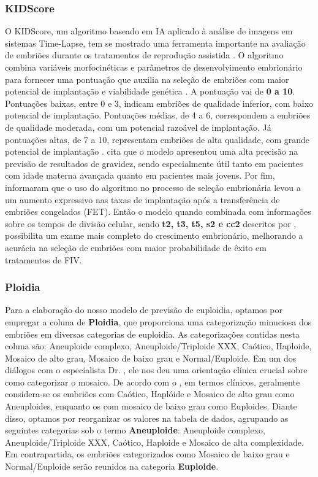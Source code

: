 \subsubsection{KIDScore\texttrademark}  
O KIDScore\texttrademark{}, um algoritmo baseado em IA aplicado à análise de imagens em sistemas Time-Lapse, tem se mostrado uma ferramenta importante na avaliação de embriões durante os tratamentos de reprodução assistida \cite{kato2021}. O algoritmo combina variáveis morfocinéticas e parâmetros de desenvolvimento embrionário para fornecer uma pontuação que auxilia na seleção de embriões com maior potencial de implantação e viabilidade genética \cite{gazzo2020}. A pontuação vai de \textbf{0 a 10}. Pontuações baixas, entre 0 e 3, indicam embriões de qualidade inferior, com baixo potencial de implantação. Pontuações médias, de 4 a 6, correspondem a embriões de qualidade moderada, com um potencial razoável de implantação. Já pontuações altas, de 7 a 10, representam embriões de alta qualidade, com grande potencial de implantação \cite{gazzo2020}.  cita que o modelo apresentou uma alta precisão na previsão de resultados de gravidez, sendo especialmente útil tanto em pacientes com idade materna avançada quanto em pacientes mais jovens. Por fim,  informaram que o uso do algoritmo no processo de seleção embrionária levou a um aumento expressivo nas taxas de implantação após a transferência de embriões congelados (FET). Então o modelo quando combinada com informações sobre os tempos de divisão celular, sendo \textbf{t2, t3, t5, s2 e cc2} descritos por , possibilita um exame mais completo do crescimento embrionário, melhorando a acurácia na seleção de embriões com maior probabilidade de êxito em tratamentos de FIV. 

\subsubsection{Ploidia}
Para a elaboração do nosso modelo de previsão de euploidia, optamos por empregar a coluna de \textbf{Ploidia}, que proporciona uma categorização minuciosa dos embriões em diversas categorias de euploidia. As categorizações contidas nesta coluna são: Aneuploide complexo, Aneuploide/Triploide XXX, Caótico, Haploide, Mosaico de alto grau, Mosaico de baixo grau e Normal/Euploide. Em um dos diálogos com o especialista Dr. , ele nos deu uma orientação clínica crucial sobre como categorizar o mosaico. De acordo com o , em termos clínicos, geralmente considera-se os embriões com Caótico, Haplóide e Mosaico de alto grau como Aneuploides, enquanto os com mosaico de baixo grau como Euploides. Diante disso, optamos por reorganizar os valores na tabela de dados, agrupando as seguintes categorias sob o termo \textbf{Aneuploide}: Aneuploide complexo, Aneuploide/Triploide XXX, Caótico, Haploide e Mosaico de alta complexidade. Em contrapartida, os embriões categorizados como Mosaico de baixo grau e Normal/Euploide serão reunidos na categoria \textbf{Euploide}.

